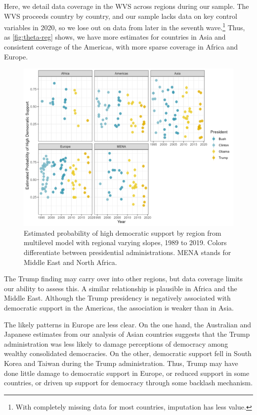 \documentclass[12pt]{article}
\begin{document}
Here, we detail data coverage in the WVS across regions during our sample. 
The WVS proceeds country by country, and our sample lacks data on key control variables in 2020, so we lose out on data from later in the seventh wave.\footnote{With completely missing data for most countries, imputation has less value.}
Thus, as \autoref{fig:theta-reg} shows, we have more estimates for countries in Asia and consistent coverage of the Americas, with more sparse coverage in Africa and Europe. 



\begin{figure}
\includegraphics[width = .95\textwidth]{theta-reg.png}
\caption{Estimated probability of high democratic support by region from multilevel model with regional varying slopes, 1989 to 2019. Colors differentiate between presidential administrations. MENA stands for Middle East and North Africa.}
\label{fig:theta-reg} 
\end{figure}


The Trump finding may carry over into other regions, but data coverage limits our ability to assess this. 
A similar relationship is plausible in Africa and the Middle East. 
Although the Trump presidency is negatively associated with democratic support in the Americas, the association is weaker than in Asia. 


The likely patterns in Europe are less clear. 
On the one hand, the Australian and Japanese estimates from our analysis of Asian countries suggests that the Trump administration was less likely to damage perceptions of democracy among wealthy consolidated democracies.
On the other, democratic support fell in South Korea and Taiwan during the Trump administration.
Thus, Trump may have done little damage to democratic support in Europe, or reduced support in some countries, or driven up support for democracy through some backlash mechanism. 
\end{document}
